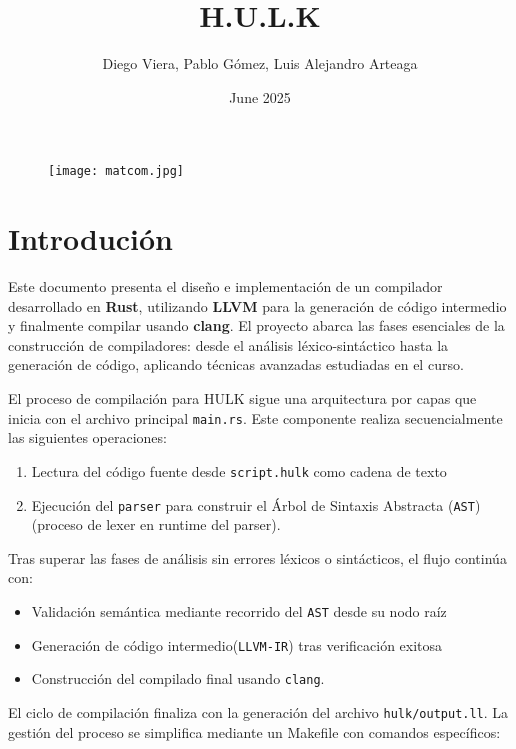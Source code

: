 \documentclass{article}
\title{H.U.L.K}
\author{Diego Viera, Pablo Gómez, Luis Alejandro Arteaga}
\date{June 2025}
\begin{document}
\begin{figure}
    \centering
    \texttt{[image: matcom.jpg]}
    \label{fig:enter-label}
\end{figure}

\maketitle

\newpage

\tableofcontents

\newpage

\section{Introdución}
Este documento presenta el diseño e implementación de un compilador desarrollado en \textbf{Rust}, utilizando \textbf{LLVM} para la generación de código intermedio y finalmente compilar usando \textbf{clang}. El proyecto abarca las fases esenciales de la construcción de compiladores: desde el análisis léxico-sintáctico hasta la generación de código, aplicando técnicas avanzadas estudiadas en el curso.

El proceso de compilación para HULK sigue una arquitectura por capas que inicia con el archivo principal \texttt{main.rs}. Este componente realiza secuencialmente las siguientes operaciones:
\begin{enumerate}
    \item Lectura del código fuente desde \texttt{script.hulk} como cadena de texto
    \item Ejecución del \texttt{parser} para construir el Árbol de Sintaxis Abstracta (\texttt{AST}) (proceso de lexer en runtime del parser).
\end{enumerate}

Tras superar las fases de análisis sin errores léxicos o sintácticos, el flujo continúa con:
\begin{itemize}
    \item Validación semántica mediante recorrido del \texttt{AST} desde su nodo raíz
    \item Generación de código intermedio(\texttt{LLVM-IR}) tras verificación exitosa
    \item Construcción del compilado final usando \texttt{clang}.
\end{itemize}

El ciclo de compilación finaliza con la generación del archivo \texttt{hulk/output.ll}. La gestión del proceso se simplifica mediante un Makefile con comandos específicos:
\end{document}
